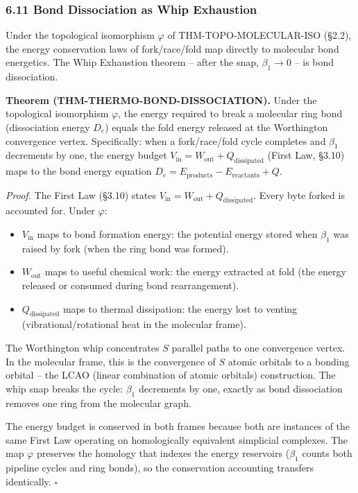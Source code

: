 \documentclass[
  11pt,
]{article}
\providecommand{\tightlist}{%
  \setlength{\itemsep}{0pt}\setlength{\parskip}{0pt}}
\begin{document}
\subsubsection{6.11 Bond Dissociation as Whip
Exhaustion}\label{bond-dissociation-as-whip-exhaustion}

Under the topological isomorphism \(\varphi\) of THM-TOPO-MOLECULAR-ISO
(§2.2), the energy conservation laws of fork/race/fold map directly to
molecular bond energetics. The Whip Exhaustion theorem -- after the
snap, \(\beta_1 \to 0\) -- is bond dissociation.

\textbf{Theorem (THM-THERMO-BOND-DISSOCIATION).} Under the topological
isomorphism \(\varphi\), the energy required to break a molecular ring
bond (dissociation energy \(D_e\)) equals the fold energy released at
the Worthington convergence vertex. Specifically: when a fork/race/fold
cycle completes and \(\beta_1\) decrements by one, the energy budget
\(V_{\text{in}} = W_{\text{out}} + Q_{\text{dissipated}}\) (First Law,
§3.10) maps to the bond energy equation
\(D_e = E_{\text{products}} - E_{\text{reactants}} + Q\).

\emph{Proof.} The First Law (§3.10) states
\(V_{\text{in}} = W_{\text{out}} + Q_{\text{dissipated}}\). Every byte
forked is accounted for. Under \(\varphi\):

\begin{itemize}
\tightlist
\item
  \(V_{\text{in}}\) maps to bond formation energy: the potential energy
  stored when \(\beta_1\) was raised by fork (when the ring bond was
  formed).
\item
  \(W_{\text{out}}\) maps to useful chemical work: the energy extracted
  at fold (the energy released or consumed during bond rearrangement).
\item
  \(Q_{\text{dissipated}}\) maps to thermal dissipation: the energy lost
  to venting (vibrational/rotational heat in the molecular frame).
\end{itemize}

The Worthington whip concentrates \(S\) parallel paths to one
convergence vertex. In the molecular frame, this is the convergence of
\(S\) atomic orbitals to a bonding orbital -- the LCAO (linear
combination of atomic orbitals) construction. The whip snap breaks the
cycle: \(\beta_1\) decrements by one, exactly as bond dissociation
removes one ring from the molecular graph.

The energy budget is conserved in both frames because both are instances
of the same First Law operating on homologically equivalent simplicial
complexes. The map \(\varphi\) preserves the homology that indexes the
energy reservoirs (\(\beta_1\) counts both pipeline cycles and ring
bonds), so the conservation accounting transfers identically.
\(\square\)
\end{document}
